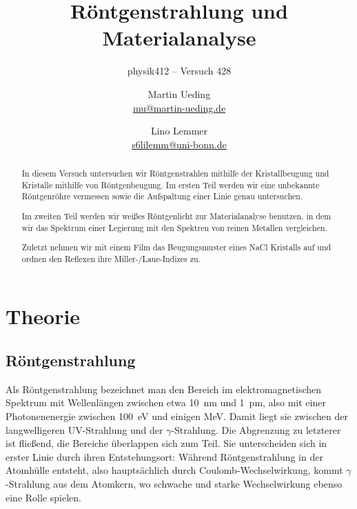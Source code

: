 


\usepackage[section]{placeins}
\usepackage{booktabs}

\newcommand\versuchsnummer{428}

\ihead{physik412 – Versuch \versuchsnummer}

\subject{Praktikumsprotokoll}
\title{Röntgenstrahlung und Materialanalyse}
\subtitle{physik412 – Versuch \versuchsnummer}
\author{
    Martin Ueding \\
    \small{\href{mailto:mu@martin-ueding.de}{mu@martin-ueding.de}}
    \and
    Lino Lemmer \\
    \small{\href{mailto:s6lilemm@uni-bonn.de}{s6lilemm@uni-bonn.de}}
}

\setcounter{secnumdepth}{4}
\setcounter{tocdepth}{3}



\maketitle

\begin{abstract}
    In diesem Versuch untersuchen wir Röntgenstrahlen mithilfe der
    Kristallbeugung und Kristalle mithilfe von Röntgenbeugung. Im ersten Teil
    werden wir eine unbekannte Röntgenröhre vermessen sowie die Aufspaltung
    einer Linie genau untersuchen.

    Im zweiten Teil werden wir weißes Röntgenlicht zur Materialanalyse
    benutzen, in dem wir das Spektrum einer Legierung mit den Spektren von
    reinen Metallen vergleichen.

    Zuletzt nehmen wir mit einem Film das Beugungsmuster eines NaCl Kristalls
    auf und ordnen den Reflexen ihre Miller-/Laue-Indizes zu.
\end{abstract}

\tableofcontents

\chapter{Theorie}

\section{Röntgenstrahlung}

Als Röntgenstrahlung bezeichnet man den Bereich im elektromagnetischen
Spektrum mit Wellenlängen zwischen etwa \SI{10}{\nano\meter} und
\SI{1}{\pico\meter}, also mit einer Photonenenergie zwischen
\SI{100}{\electronvolt} und einigen \si{\mega\electronvolt}. Damit liegt sie
zwischen der langwelligeren UV-Strahlung und der $\gamma$-Strahlung. Die
Abgrenzung zu letzterer ist fließend, die Bereiche überlappen sich zum
Teil. Sie unterscheiden sich in erster Linie durch ihren Entstehungsort:
Während Röntgenstrahlung in der Atomhülle entsteht, also hauptsächlich
durch Coulomb-Wechselwirkung, kommt $\gamma$-Strahlung aus dem Atomkern, wo
schwache und starke Wechselwirkung ebenso eine Rolle spielen.

